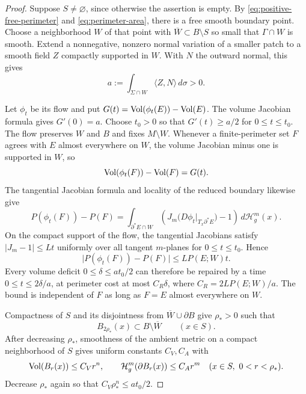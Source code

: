 \begin{proof}
Suppose $S\ne\varnothing$, since otherwise the assertion is empty.
By \eqref{eq:positive-free-perimeter} and
\eqref{eq:perimeter-area}, there is a free smooth boundary point.
Choose a neighborhood $W$ of that point with
$\overline W\subset B\setminus S$ so small that $\Gamma\cap W$ is
smooth.  Extend a nonnegative, nonzero normal variation of a smaller
patch to a smooth field $Z$ compactly supported in $W$.  With $N$ the
outward normal, this gives
\[
 a:=\int_{\Sigma\cap W}\langle Z,N\rangle\,d\sigma>0.
\]

Let $\phi_t$ be its flow and put
$G(t)=\operatorname{Vol}(\phi_t(E))-\operatorname{Vol}(E)$.  The volume Jacobian formula gives
$G'(0)=a$.  Choose $t_0>0$ so that $G'(t)\ge a/2$ for
$0\le t\le t_0$.  The flow preserves $W$ and $B$ and fixes
$M\setminus W$.  Whenever a finite-perimeter set $F$ agrees with $E$
almost everywhere on $W$, the volume Jacobian minus one is supported
in $W$, so
\begin{equation}
\label{eq:fixed-patch-volume}
 \operatorname{Vol}(\phi_t(F))-\operatorname{Vol}(F)=G(t).
\end{equation}
The tangential Jacobian formula and locality of the reduced boundary
likewise give
\[
 P(\phi_t(F))-P(F)
 =\int_{\partial^*E\cap W}
 \left(J_m\bigl(D\phi_t|_{T_x\partial^*E}\bigr)-1\right)
 \,d\mathcal H_g^m(x).
\]
On the compact support of the flow, the tangential Jacobians satisfy
$|J_m-1|\le Lt$ uniformly over all tangent $m$-planes for
$0\le t\le t_0$.  Hence
\begin{equation}
\label{eq:fixed-patch-perimeter}
 \bigl|P(\phi_t(F))-P(F)\bigr|\le L P(E;W)t.
\end{equation}
Every volume deficit $0\le\delta\le at_0/2$ can therefore be
repaired by a time $0\le t\le2\delta/a$, at perimeter cost at most
$C_R\delta$, where $C_R=2LP(E;W)/a$.  The bound is independent of
$F$ as long as $F=E$ almost everywhere on $W$.

Compactness of $S$ and its disjointness from
$\overline W\cup\partial B$ give $\rho_*>0$ such that
\[
 B_{2\rho_*}(x)\subset B\setminus\overline W
 \qquad(x\in S).
\]
After decreasing $\rho_*$, smoothness of the ambient metric on a
compact neighborhood of $S$ gives uniform constants $C_V,C_A$ with
\begin{equation}
\label{eq:small-ambient-balls}
 \operatorname{Vol}(B_r(x))\le C_Vr^n,
 \qquad
 \mathcal H_g^m(\partial B_r(x))\le C_Ar^m
 \quad(x\in S,\ 0<r<\rho_*).
\end{equation}
Decrease $\rho_*$ again so that $C_V\rho_*^n\le at_0/2$.


\end{proof}
